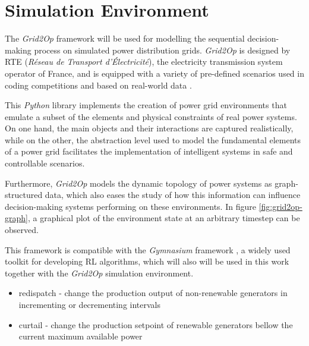 \section{Simulation Environment} \label{sec:method-environment}

The \textit{Grid2Op} framework \cite{rtefranceGrid2OpDocumentation} will be used for modelling the sequential decision-making process on simulated power distribution grids. \textit{Grid2Op} is designed by RTE (\textit{Réseau de Transport d'Électricité}), the electricity transmission system operator of France, and is equipped with a variety of pre-defined scenarios used in coding competitions and based on real-world data \cite{rtefranceGrid2OpDocumentation}. \par
This \textit{Python} library implements the creation of power grid environments that emulate a subset of the elements and physical constraints of real power systems. On one hand, the main objects and their interactions are captured realistically, while on the other, the abstraction level used to model the fundamental elements of a power grid facilitates the implementation of intelligent systems in safe and controllable scenarios. \par
Furthermore, \textit{Grid2Op} models the dynamic topology of power systems as graph-structured data, which also eases the study of how this information can influence decision-making systems performing on these environments.  In figure \ref{fig:grid2op-graph}, a graphical plot of the environment state at an arbitrary timestep can be observed. \par
This framework is compatible with the \textit{Gymnasium} framework \cite{faramafoundationGymnasiumDocumentation}, a widely used toolkit for developing \ac{RL} algorithms, which will also will be used in this work together with the \textit{Grid2Op} simulation environment. 

\begin{itemize}
	\item redispatch - change the production output of non-renewable generators in incrementing or decrementing intervals 
	\item curtail - change the production setpoint of renewable generators bellow the current maximum available power \cite{rtefranceGrid2OpDocumentation}
\end{itemize}



